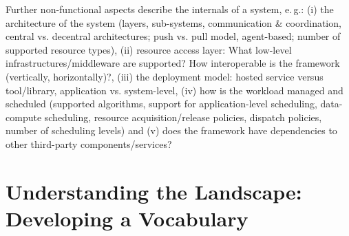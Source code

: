 \documentclass{sig-alternate}
\begin{document}
Further non-functional aspects describe the internals of a \pilotjob system, 
e.\,g.: (i) the architecture of the system (layers, sub-systems,
communication \& coordination, central vs. decentral architectures; push vs.
pull model, agent-based; number of supported resource types), (ii) resource
access layer: What low-level infrastructures/middleware are supported? How
interoperable is the framework (vertically, horizontally)?, (iii) the
deployment model: hosted service versus tool/library, application vs.
system-level, (iv) how is the workload managed and scheduled (supported
algorithms, support for application-level scheduling, data-compute scheduling,
resource acquisition/release policies, dispatch policies, number of scheduling
levels) and (v) does the framework have dependencies to other third-party
components/services?




\section{Understanding the Landscape: Developing a Vocabulary}
\label{sec:vocab}

\end{document}
